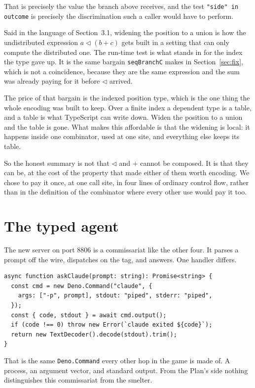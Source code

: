 \documentclass[11pt,a4paper]{article}
\begin{document}
That is precisely the value the branch above receives, and the test \texttt{"side" in outcome}
is precisely the discrimination such a caller would have to perform.

Said in the language of Section~3.1, widening the position to a union is how the undistributed
expression $a \lhd (b + c)$ gets built in a setting that can only compute the distributed one.
The run-time test is what stands in for the index the type gave up. It is the same bargain
\texttt{seqBranchC} makes in Section~\ref{sec:fix}, which is not a coincidence, because they are
the same expression and the sum was already paying for it before $\lhd$ arrived.

The price of that bargain is the indexed position type, which is the one thing the whole
encoding was built to keep. Over a finite index a dependent type is a table, and a table is what
TypeScript can write down. Widen the position to a union and the table is gone. What makes this
affordable is that the widening is local: it happens inside one combinator, used at one site,
and everything else keeps its table.

So the honest summary is not that $\lhd$ and $+$ cannot be composed. It is that they can be, at
the cost of the property that made either of them worth encoding. We chose to pay it once, at
one call site, in four lines of ordinary control flow, rather than in the definition of the
combinator where every other use would pay it too.

\section{The typed agent}

The new server on port 8806 is a commissariat like the other four. It parses a prompt off the
wire, dispatches on the tag, and answers. One handler differs.

\begin{lstlisting}[language=TS]
async function askClaude(prompt: string): Promise<string> {
  const cmd = new Deno.Command("claude", {
    args: ["-p", prompt], stdout: "piped", stderr: "piped",
  });
  const { code, stdout } = await cmd.output();
  if (code !== 0) throw new Error(`claude exited ${code}`);
  return new TextDecoder().decode(stdout).trim();
}
\end{lstlisting}

That is the same \texttt{Deno.Command} every other hop in the game is made of. A process, an
argument vector, and standard output. From the Plan's side nothing distinguishes this
commissariat from the smelter.
\end{document}
